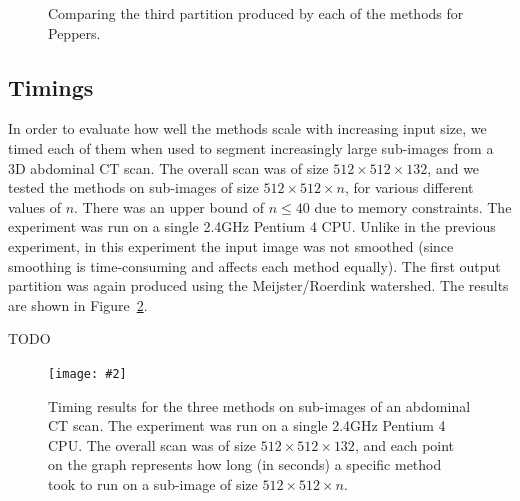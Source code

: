 \documentclass[a4paper]{article}
\newcommand{\stufigex}[5]					%
{
	\begin{figure}[#5]
	\begin{center}
		\texttt{[image: \#2]}
		\caption{#3}
		\label{#4}
	\end{center}
	\end{figure}
}
\newenvironment{stusubfig}[1]
{
	\begin{figure}[#1]
	\begin{center}
}
{
	\end{center}
	\end{figure}
}
\begin{document}
\begin{stusubfig}{p}
	\hspace{4mm}%
	\hspace{4mm}%
\caption[]{Comparing the third partition produced by each of the methods for Peppers.}
\label{fig:results-peppers}
\end{stusubfig}

\subsection{Timings}

In order to evaluate how well the methods scale with increasing input size, we timed each of them when used to segment increasingly large sub-images from a 3D abdominal CT scan\footnotemark{}. The overall scan was of size $512 \times 512 \times 132$, and we tested the methods on sub-images of size $512 \times 512 \times n$, for various different values of $n$. There was an upper bound of $n \le 40$ due to memory constraints. The experiment was run on a single 2.4GHz Pentium 4 CPU. Unlike in the previous experiment, in this experiment the input image was not smoothed (since smoothing is time-consuming and affects each method equally). The first output partition was again produced using the Meijster/Roerdink watershed. The results are shown in Figure~\ref{fig:timings}.

TODO

\stufigex{width=.95\linewidth}{timings.png}{Timing results for the three methods on sub-images of an abdominal CT scan. The experiment was run on a single 2.4GHz Pentium 4 CPU. The overall scan was of size $512 \times 512 \times 132$, and each point on the graph represents how long (in seconds) a specific method took to run on a sub-image of size $512 \times 512 \times n$.}{fig:timings}{!t}
\end{document}
